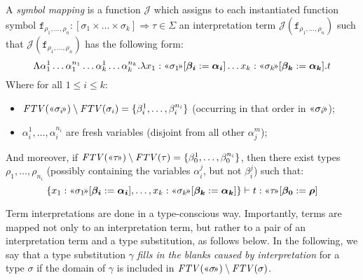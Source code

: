 \documentclass[runningheads,a4paper]{llncs}
\newcommand{\Termmap}{\mathcal{J}}
\newcommand{\typeinterpret}[1]{\text{\guillemotleft} #1\! \text{\guillemotright}}
\newcommand{\arrtype}{\Rightarrow}
\newcommand{\abs}[2]{\lambda #1.#2}
\newcommand{\tabs}[2]{\Lambda #1.#2}
\newcommand{\FTV}{\mathit{FTV}}
\begin{document}
\begin{definition}
A \emph{symbol mapping} is a function $\Termmap$ which assigns to each
instantiated function symbol $\mathtt{f}_{\rho_1,\dots,\rho_n} :
[\sigma_1 \times \dots \times \sigma_k] \arrtype \tau \in \Sigma$ an
interpretation term $\Termmap(\mathtt{f}_{\rho_1,\dots,\rho_n})$ such
that $\Termmap(\mathtt{f}_{\rho_1,\dots,\rho_n})$ has the following
form:
\[
\tabs{\alpha_1^1 \dots \alpha_1^{n_1} \dots \alpha_k^1 \dots \alpha_k^{n_k}}{
\abs{x_1:\typeinterpret{\sigma_1}[\vec{\beta_i}:=\vec{\alpha_i}] \dots
x_k:\typeinterpret{\sigma_k}[\vec{\beta_k}:=\vec{\alpha_k}]}{t}}
\]
Where for all $1 \leq i \leq k$:
\begin{itemize}
\item $\FTV(\typeinterpret{\sigma_i}) \setminus \FTV(\sigma_i) =
  \{ \beta_i^1,\dots,\beta_i^{n_i} \}$ (occurring in that order in
  $\typeinterpret{\sigma_i}$);
\item $\alpha_i^1,\dots,\alpha_i^{n_i}$ are fresh variables (disjoint
    from all other $\alpha_j^m$);
\end{itemize}
And moreover, if $\FTV(\typeinterpret{\tau}) \setminus \FTV(\tau) =
\{ \beta_0^1,\dots,\beta_0^{n_i} \}$, then there exist types
$\rho_1,\dots,\rho_{n_i}$ (possibly containing the variables
$\alpha_i^j$, but not $\beta_i^j$) such that:
\[
\{ x_1 : \typeinterpret{\sigma_1}[\vec{\beta_i}:=\vec{\alpha_i}],
\dots, x_k : \typeinterpret{\sigma_k}[\vec{\beta_k}:=\vec{\alpha_k}]
\} \vdash t : \typeinterpret{\tau}[\vec{\beta_0}:=\vec{\rho}]
\]
\end{definition}

Term interpretations are done in a type-conscious way.  Importantly,
terms are mapped not only to an interpretation term, but rather to a
pair of an interpretation term and a type substitution, as follows
below.
In the following, we say that a type substitution $\gamma$ \emph{fills
in the blanks caused by interpretation} for a type $\sigma$ if the
domain of $\gamma$ is included in $\FTV(\typeinterpret{\sigma})
\setminus \FTV(\sigma)$.
\end{document}
